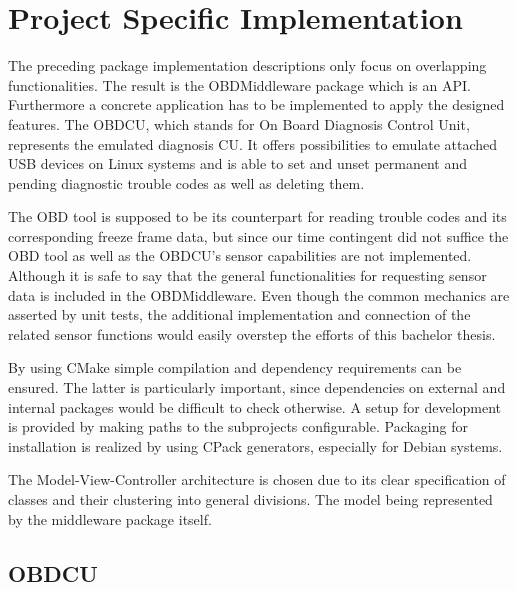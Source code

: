 

\chapter{Project Specific Implementation}
\label{sec:projectspecific} 

The preceding package implementation descriptions only focus on overlapping functionalities. 
The result is the OBDMiddleware package which is an API.
Furthermore a concrete application has to be implemented to apply the designed features.
The OBDCU, which stands for On Board Diagnosis Control Unit, represents the emulated diagnosis CU.
It offers possibilities to emulate attached USB devices on Linux systems and is able to set and unset
permanent and pending diagnostic trouble codes as well as deleting them.

The OBD tool is supposed to be its counterpart for reading trouble codes and its corresponding freeze frame data,
but since our time contingent did not suffice the OBD tool as well as the OBDCU’s sensor capabilities are not implemented. 
Although it is safe to say that the general functionalities for requesting sensor data is included in the OBDMiddleware. 
Even though the common mechanics are asserted by unit tests,
the additional implementation and connection of the related sensor functions would easily overstep the efforts of this bachelor thesis.

By using CMake simple compilation and dependency requirements can be ensured.
The latter is particularly important, since dependencies on external and internal packages would be difficult to check otherwise.
A setup for development is provided by making paths to the subprojects configurable. 
Packaging for installation is realized by using CPack generators, especially for Debian systems.

The Model-View-Controller architecture is chosen due to its clear specification of classes and their clustering into general divisions. 
The model being represented by the middleware package itself.

\section{OBDCU}

